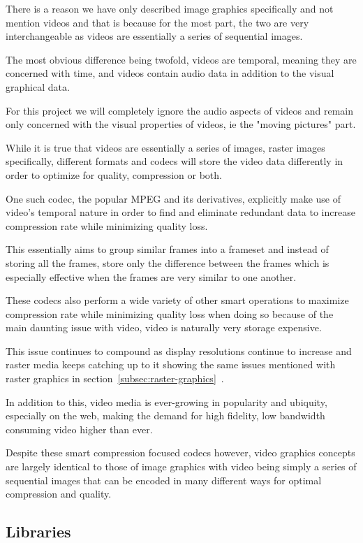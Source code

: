 \documentclass[12pt]{article}
\newcommand{\sentence}{} %
\newcommand{\fullref}[1]{\ref{#1}~\nameref{#1}}
\begin{document}
    \tab
    There is a reason we have only described image graphics specifically and not mention videos and
    that is because for the most part, the two are very interchangeable as videos are essentially a series of
    sequential images.
    \sentence
    The most obvious difference being twofold, videos are temporal, meaning they are concerned with time, and videos
    contain audio data in addition to the visual graphical data.
    \sentence
    For this project we will completely ignore the audio aspects of videos and remain only concerned with the visual
    properties of videos, ie the "moving pictures" part.
    \sentence
    While it is true that videos are essentially a series of images, raster images specifically, different formats
    and codecs will store the video data differently in order to optimize for quality, compression or both.
    \sentence
    One such codec, the popular MPEG and its derivatives, explicitly make use of video's temporal nature in order to
    find and eliminate redundant data to increase compression rate while minimizing quality loss\cite{richardson2004h}.
    \sentence
    This essentially aims to group similar frames into a frameset and instead of storing all the frames, store only
    the difference between the frames which is especially effective when the frames are very similar to one another.
    \sentence
    These codecs also perform a wide variety of other smart operations to maximize compression rate while minimizing
    quality loss when doing so because of the main daunting issue with video, video is naturally very storage
    expensive\cite{richardson2004h}.
    \sentence
    This issue continues to compound as display resolutions continue to increase and raster media keeps catching up
    to it showing the same issues mentioned with raster graphics in section~\fullref{subsec:raster-graphics}.
    \sentence
    In addition to this, video media is ever-growing in popularity and ubiquity, especially on the web, making the
    demand for high fidelity, low bandwidth consuming video higher than ever.
    \sentence
    Despite these smart compression focused codecs however, video graphics concepts are largely identical to those of
    image graphics with video being simply a series of sequential images that can be encoded in many different ways
    for optimal compression and quality.

    \subsection{Libraries}\label{subsec:libraries}
\end{document}
